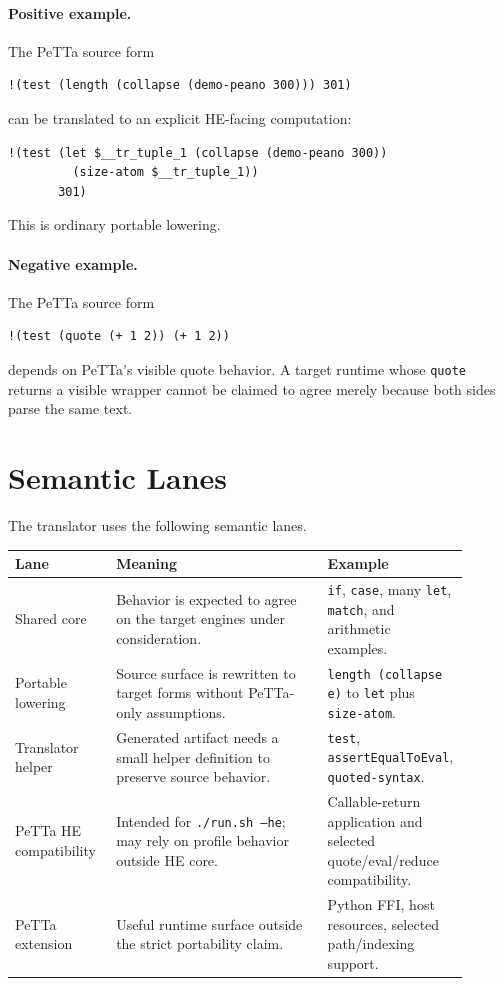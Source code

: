 \documentclass[11pt]{article}
\newcommand{\code}[1]{\texttt{#1}}
\newcommand{\HE}{\textup{HE}}
\newcommand{\PeTTa}{\textup{PeTTa}}
\begin{document}
\paragraph{Positive example.}
The \PeTTa{} source form
\begin{lstlisting}
!(test (length (collapse (demo-peano 300))) 301)
\end{lstlisting}
can be translated to an explicit \HE{}-facing computation:
\begin{lstlisting}
!(test (let $__tr_tuple_1 (collapse (demo-peano 300))
         (size-atom $__tr_tuple_1))
       301)
\end{lstlisting}
This is ordinary portable lowering.

\paragraph{Negative example.}
The \PeTTa{} source form
\begin{lstlisting}
!(test (quote (+ 1 2)) (+ 1 2))
\end{lstlisting}
depends on \PeTTa{}'s visible quote behavior.  A target runtime whose
\code{quote} returns a visible wrapper cannot be claimed to agree merely
because both sides parse the same text.

\section{Semantic Lanes}

The translator uses the following semantic lanes.

\begin{longtable}{>{\raggedright\arraybackslash}p{0.22\linewidth}
                  >{\raggedright\arraybackslash}p{0.46\linewidth}
                  >{\raggedright\arraybackslash}p{0.22\linewidth}}
\toprule
Lane & Meaning & Example \\
\midrule
\endhead
Shared core & Behavior is expected to agree on the target engines under
consideration. & \code{if}, \code{case}, many \code{let}, \code{match}, and
arithmetic examples. \\
Portable lowering & Source surface is rewritten to target forms without
\PeTTa{}-only assumptions. & \code{length (collapse e)} to \code{let} plus
\code{size-atom}. \\
Translator helper & Generated artifact needs a small helper definition to
preserve source behavior. & \code{test}, \code{assertEqualToEval},
\code{quoted-syntax}. \\
\PeTTa{} \HE{} compatibility & Intended for \code{./run.sh --he}; may rely on
profile behavior outside \HE{} core. & Callable-return application and selected
quote/eval/reduce compatibility. \\
\PeTTa{} extension & Useful runtime surface outside the strict portability
claim. & Python FFI, host resources, selected path/indexing support. \\
\bottomrule
\end{longtable}
\end{document}
